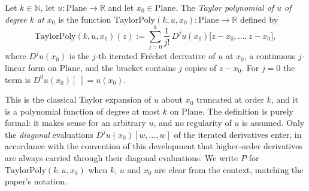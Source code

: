 \begin{definition}
Let $k\in\mathbb{N}$, let $u\colon\mathrm{Plane}\to\mathbb{R}$ and let
$x_0\in\mathrm{Plane}$.  The \emph{Taylor polynomial of $u$ of degree $k$ at $x_0$} is the
function $\mathrm{TaylorPoly}(k,u,x_0)\colon\mathrm{Plane}\to\mathbb{R}$ defined by
\[
  \mathrm{TaylorPoly}(k,u,x_0)(z)
  :=\sum_{j=0}^{k}\frac{1}{j!}\,D^{j}u(x_0)\bigl[z-x_0,\ldots,z-x_0\bigr],
\]
where $D^{j}u(x_0)$ is the $j$-th iterated Fr\'echet derivative of $u$ at $x_0$, a continuous
$j$-linear form on $\mathrm{Plane}$, and the bracket contains $j$ copies of $z-x_0$.  For
$j=0$ the term is $D^{0}u(x_0)[\;]=u(x_0)$.

This is the classical Taylor expansion of $u$ about $x_0$ truncated at order $k$, and it is
a polynomial function of degree at most $k$ on $\mathrm{Plane}$.  The definition is purely
formal: it makes sense for an arbitrary $u$, and no regularity of $u$ is assumed.  Only the
\emph{diagonal} evaluations $D^{j}u(x_0)[w,\ldots,w]$ of the iterated derivatives enter, in
accordance with the convention of this development that higher-order derivatives are always
carried through their diagonal evaluations.  We write $P$ for
$\mathrm{TaylorPoly}(k,u,x_0)$ when $k$, $u$ and $x_0$ are clear from the context, matching
the paper's notation.
\end{definition}
